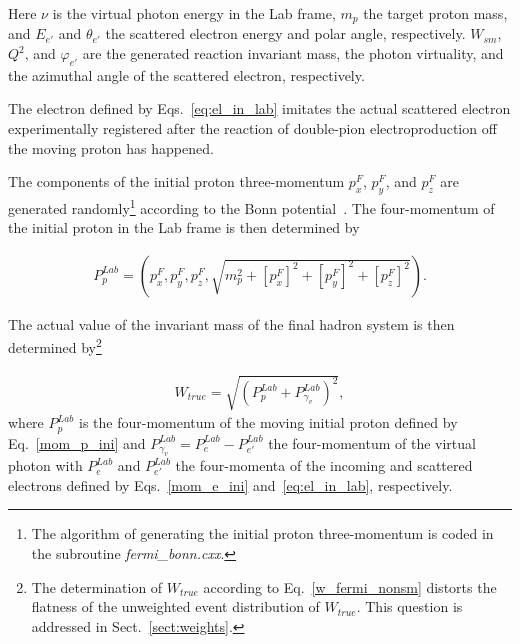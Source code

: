 \begin{itemize}
Here $\nu$ is the virtual photon energy in the Lab frame, $m_{p}$ the target proton mass, and $E_{e'}$ and $\theta_{e'}$ the scattered electron energy and polar angle, respectively. $W_{sm}$, $Q^2$, and $\varphi_{e'}$ are the generated reaction invariant mass, the photon virtuality, and the azimuthal angle of the scattered electron, respectively.


The electron defined by Eqs.~\eqref{eq:el_in_lab} imitates the actual scattered electron experimentally registered after the reaction of double-pion electroproduction off the moving proton has happened.




\end{itemize}

The components of the initial proton three-momentum $p_{x}^{F}$, $p_{y}^{F}$, and $p_{z}^{F}$ are generated randomly\footnote[1]{The algorithm of generating the initial proton three-momentum is coded in the subroutine \textit{fermi\_bonn.cxx}.} according to the Bonn potential~\cite{Machleidt:1987hj}. The four-momentum of the initial proton in the Lab frame is then determined by




\begin{equation}
\begin{aligned}\label{mom_p_ini}
P_{p}^{Lab} = (p_{x}^{F}, p_{y}^{F}, p_{z}^{F}, \sqrt{m_{p}^{2}+[p_{x}^{F}]^{2}+[p_{y}^{F}]^{2}+[p_{z}^{F}]^{2}}).
\end{aligned}
\end{equation}

The actual value of the invariant mass of the final hadron system is then determined by\footnote[2]{The determination of $W_{true}$ according to Eq.~\eqref{w_fermi_nonsm} distorts the flatness of the unweighted event distribution of $W_{true}$. This question is addressed in Sect.~\ref{sect:weights}.}



\begin{equation}
\begin{aligned}\label{w_fermi_nonsm}
W_{true}=\sqrt{(P^{Lab}_{p}+P_{\gamma_{v}}^{Lab})^{2}},
\end{aligned}
\end{equation}
where $P^{Lab}_{p}$ is the four-momentum of the moving initial proton defined by Eq.~\eqref{mom_p_ini} and $P_{\gamma_{v}}^{Lab}=P_{e}^{Lab}-P_{e'}^{Lab}$ the four-momentum of the virtual photon with $P_{e}^{Lab}$ and $P_{e'}^{Lab}$ the four-momenta of the incoming and scattered electrons defined by Eqs.~\eqref{mom_e_ini} and~\eqref{eq:el_in_lab}, respectively. 

